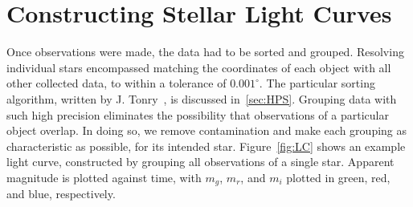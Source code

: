 \documentclass[aps,prb,twocolumn,superscriptaddress]{revtex4-1}
\begin{document}

\section{Constructing Stellar Light Curves}

Once observations were made, the data had to be sorted and grouped.  Resolving individual stars encompassed 
matching the coordinates of each object with all other collected data, to within a tolerance of $0.001^{\circ}$.  
The particular sorting algorithm, written by J. Tonry~\cite{gri}, is discussed in~\cref{sec:HPS}.  Grouping data 
with such high precision eliminates the possibility that observations of a particular object overlap.  
In doing so, we remove contamination and make each grouping as characteristic as possible, for its intended star.  
Figure~\ref{fig:LC} shows an example light curve, constructed by grouping all observations of a single star.  
Apparent magnitude is plotted against time, with $m_{g}$, $m_{r}$, and $m_{i}$ plotted in green, red, and blue, respectively.

\end{document}
